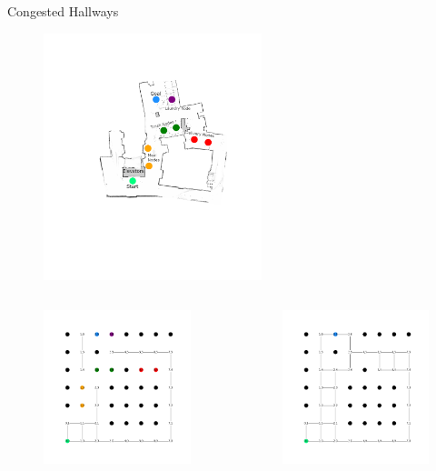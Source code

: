 \documentclass{beamer}
\begin{document}
\begin{frame}[t]{Congested Hallways}
  \vspace*{-2cm}


  \begin{figure}
    \includegraphics[width=2.5in]{images/results/overlay.png}
    \vspace*{-2.5cm} %
  \end{figure}

  \vspace*{-.75cm} %
  \begin{columns}[T]
    \begin{column}{0.5\textwidth}
      \begin{figure}
        \includegraphics[width=1.75in]{images/results/Full_Hospital.png}
        \vspace*{-0.3cm}
      \end{figure}
    \end{column}

    \begin{column}{0.5\textwidth}
      \begin{figure}
        \includegraphics[width=1.75in]{images/results/Empty_Hospital.png}
        \vspace*{-0.3cm}
      \end{figure}
    \end{column}
  \end{columns}

\end{frame}
\end{document}
